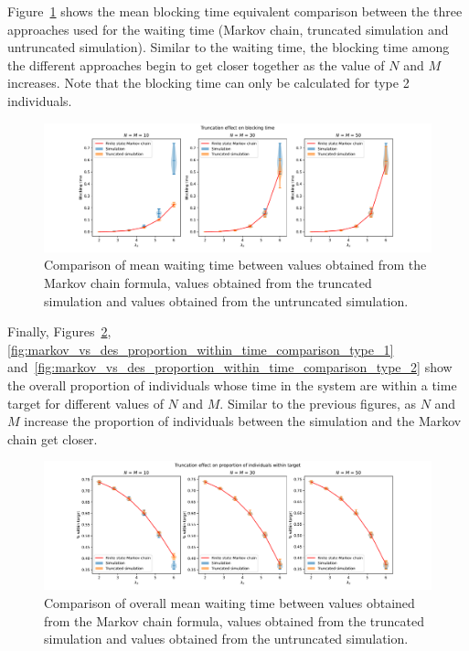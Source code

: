 Figure~\ref{fig:markov_vs_des_blocking_time_comparison_overall} shows
the mean blocking time equivalent comparison between the three approaches used
for the waiting time (Markov chain, truncated simulation and untruncated
simulation).
Similar to the waiting time, the blocking time among the different approaches
begin to get closer together as the value of \(N\) and \(M\) increases.
Note that the blocking time can only be calculated for type 2 individuals.

\begin{figure}[H]
    \includegraphics[width=\textwidth]{chapters/03_queueing_model/img/numeric_results_and_timings/truncation_effect/blocking_time_type_2.pdf}
    \caption{
        Comparison of mean waiting time between values obtained from the Markov 
        chain formula, values obtained from the truncated simulation and values
        obtained from the untruncated simulation.
    }
    \label{fig:markov_vs_des_blocking_time_comparison_overall}
\end{figure}

Finally, Figures~\ref{fig:markov_vs_des_proportion_within_time_comparison_overall},
\ref{fig:markov_vs_des_proportion_within_time_comparison_type_1}
and~\ref{fig:markov_vs_des_proportion_within_time_comparison_type_2} show the
overall proportion of individuals whose time in the system are within
a time target for different values of \(N\) and \(M\).
Similar to the previous figures, as \(N\) and \(M\) increase the proportion of
individuals between the simulation and the Markov chain get closer.


\begin{figure}[H]
    \includegraphics[width=\textwidth]{chapters/03_queueing_model/img/numeric_results_and_timings/truncation_effect/proportion_overall.pdf}
    \caption{
        Comparison of overall mean waiting time between values obtained from the
        Markov chain formula, values obtained from the truncated simulation and
        values obtained from the untruncated simulation.
    }
    \label{fig:markov_vs_des_proportion_within_time_comparison_overall}
\end{figure}

